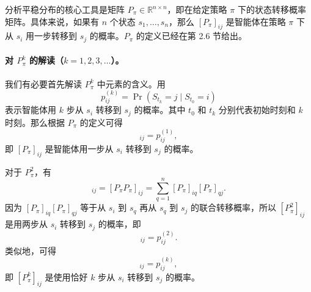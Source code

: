\begin{note}[方框 8.1：马尔可夫决策过程的平稳分布]
分析平稳分布的核心工具是矩阵 $P_{\pi} \in \mathbb{R}^{n \times n}$，即在给定策略 $\pi$ 下的状态转移概率矩阵。具体来说，如果有 $n$ 个状态 $s_1, \ldots, s_n$，那么 $[P_{\pi}]_{ij}$ 是智能体在策略 $\pi$ 下从 $s_i$ 用一步转移到 $s_j$ 的概率。$P_{\pi}$ 的定义已经在第 2.6 节给出。

\paragraph{对 $P_{\pi}^{k}$ 的解读（$k=1,2,3,\ldots$）。}我们有必要首先解读 $P_{\pi}^{k}$ 中元素的含义。用
\begin{equation*}
p_{ij}^{(k)} = \operatorname{Pr}(S_{t_{k}} = j \mid S_{t_{0}} = i)
\end{equation*}
表示智能体用 $k$ 步从 $s_i$ 转移到 $s_j$ 的概率。其中 $t_0$ 和 $t_k$ 分别代表初始时刻和 $k$ 时刻。那么根据 $P_{\pi}$ 的定义可得
\begin{equation*}
[P_{\pi}]_{ij} = p_{ij}^{(1)},
\end{equation*}
即 $[P_{\pi}]_{ij}$ 是智能体用一步从 $s_i$ 转移到 $s_j$ 的概率。

对于 $P_{\pi}^{2}$，有
\begin{equation*}
[P_{\pi}^{2}]_{ij} = [P_{\pi} P_{\pi}]_{ij} = \sum_{q=1}^{n} [P_{\pi}]_{iq} [P_{\pi}]_{qj}.
\end{equation*}
因为 $[P_{\pi}]_{iq}[P_{\pi}]_{qj}$ 等于从 $s_i$ 到 $s_q$ 再从 $s_q$ 到 $s_j$ 的联合转移概率，所以 $[P_{\pi}^{2}]_{ij}$ 是用两步从 $s_i$ 转移到 $s_j$ 的概率，即
\begin{equation*}
[P_{\pi}^{2}]_{ij} = p_{ij}^{(2)}.
\end{equation*}
类似地，可得
\begin{equation*}
[P_{\pi}^{k}]_{ij} = p_{ij}^{(k)},
\end{equation*}
即 $[P_{\pi}^{k}]_{ij}$ 是使用恰好 $k$ 步从 $s_i$ 转移到 $s_j$ 的概率。


\end{note}
